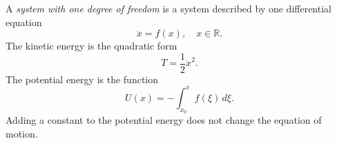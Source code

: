 A \textit{system with one degree of freedom} is a system described by one differential equation
$$\ddot{x} = f(x), \quad x \in \mathbb{R}.$$
The kinetic energy is the quadratic form
$$T = \frac{1}{2} \dot{x}^2.$$
The potential energy is the function
$$U(x) = -\int_{x_0}^{x} f(\xi)\,d\xi.$$
Adding a constant to the potential energy does not change the equation of motion.
